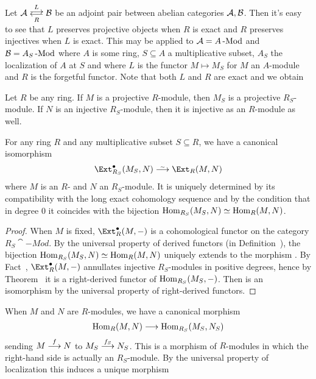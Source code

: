 \documentclass[a4paper,parskip=half,numbers=enddot, DIV=12]{scrreprt}
\begin{document}
Let $\Aa\doublelrmorphism[L][R]\Bb$ be an adjoint pair between abelian categories $\mathcal{A},\mathcal{B}$. Then it's easy to see that $L$ preserves projective objects when $R$ is exact and $R$ preserves injectives when $L$ is exact. This may be applied to $\mathcal{A}=A\operatorname{-Mod}$ and $\mathcal{B}=A_S\operatorname{-Mod}$ where $A$ is some ring, $S\subseteq A$ a multiplicative subset, $A_S$ the localization of $A$ at $S$ and where $L$ is the functor $M\mapsto M_S$ for $M$ an $A$-module and $R$ is the forgetful functor. Note that both $L$ and $R$ are exact and we obtain
\begin{fact}
	Let $R$ be any ring. If $M$ is a projective $R$-module, then $M_S$ is a projective $R_S$-module. If $N$ is an injective $R_S$-module, then it is injective as an $R$-module as well.
\end{fact}
\begin{fact}
	For any ring $R$ and any multiplicative subset $S\subseteq R$, we have a canonical isomorphism
	\begin{align}\lbl{eq:ExtRStoExtR}
		\Ext_{R_S}^\bullet(M_S,N)\isomorphism\Ext_R(M,N)
	\end{align}
	where $M$ is an $R$- and $N$ an $R_S$-module. It is uniquely determined by its compatibility with the long exact cohomology sequence and by the condition that in degree $0$ it coincides with the bijection $\operatorname{Hom}_{R_S}(M_S,N)\simeq \operatorname{Hom}_R(M,N)$.
\end{fact}
\begin{proof}
	When $M$ is fixed, $\Ext_R^\bullet(M,-)$ is a cohomological functor on the category $R_S\cat{-Mod}$. By the universal property of derived functors (in Definition~), the bijection $\operatorname{Hom}_{R_S}(M_S,N)\simeq \operatorname{Hom}_R(M,N)$ uniquely extends to the morphism . By Fact~, $\Ext_R^\bullet(M,-)$ annullates injective $R_S$-modules in positive degrees, hence by Theorem~ it is a right-derived functor of $\operatorname{Hom}_{R_S}(M_S,-)$. Then  is an isomorphism by the universal property of right-derived functors.
\end{proof}
When $M$ and $N$ are $R$-modules, we have a canonical morphism
\begin{align*}
	\Hom_R(M,N)\morphism\Hom_{R_S}(M_S,N_S)
\end{align*}
sending $M\morphism[f]N$ to $M_S\morphism[f_S]N_S$. This is a morphism of $R$-modules in which the right-hand side is actually an $R_S$-module. By the universal property of localization this induces a unique morphism
\end{document}
